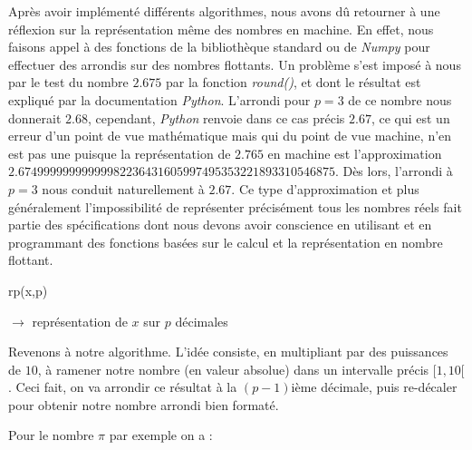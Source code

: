 \documentclass{article}
\begin{document}
Après avoir implémenté différents algorithmes, nous avons dû retourner à une réflexion sur la représentation même des nombres en machine. En effet, nous faisons appel à des fonctions de la bibliothèque standard ou de \textit{Numpy} pour effectuer des arrondis sur des nombres flottants. Un problème s'est imposé à nous par le test du nombre $2.675$ par la fonction \textit{round()}, et dont le résultat est expliqué par la documentation \textit{Python}. L'arrondi pour $p = 3$ de ce nombre nous donnerait $2.68$, cependant, \textit{Python} renvoie dans ce cas précis $2.67$, ce qui est un erreur d'un point de vue mathématique mais qui du point de vue machine, n'en est pas une puisque la représentation de $2.765$ en machine est l'approximation $2.67499999999999982236431605997495353221893310546875$. Dès lors, l'arrondi à $p = 3$ nous conduit naturellement à $2.67$. Ce type d'approximation et plus généralement l'impossibilité de représenter précisément tous les nombres réels fait partie des spécifications dont nous devons avoir conscience en utilisant et en programmant des fonctions basées sur le calcul et la représentation en nombre flottant.\medskip

\begin{function}[H]
    \SetAlgoLined
    \caption{rp(x,p)}
     $\longrightarrow$ représentation de $x$ sur $p$ décimales\\
\end{function}

\newpage

Revenons à notre algorithme. L'idée consiste, en multipliant par des puissances de $10$, à ramener notre nombre (en valeur absolue) dans un intervalle précis $[1,10[$. Ceci fait, on va arrondir ce résultat à la $(p-1)$ième décimale, puis re-décaler pour obtenir notre nombre arrondi bien formaté.\medskip

Pour le nombre  $\pi$  par exemple  on a :
\end{document}
